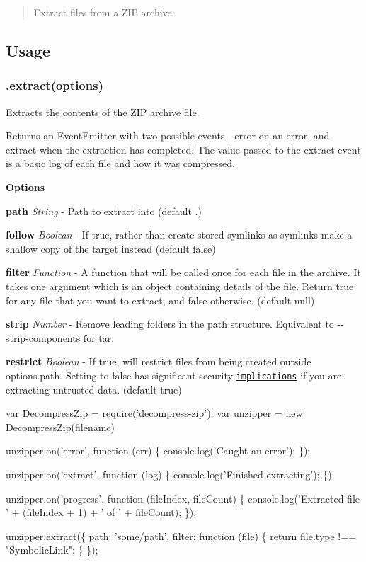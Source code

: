 \begin{quote}
Extract files from a Z\+IP archive \end{quote}


\subsection*{Usage}

\subsubsection*{.extract(options)}

Extracts the contents of the Z\+IP archive {\ttfamily file}.

Returns an Event\+Emitter with two possible events -\/ {\ttfamily error} on an error, and {\ttfamily extract} when the extraction has completed. The value passed to the {\ttfamily extract} event is a basic log of each file and how it was compressed.

{\bfseries Options}
\begin{DoxyItemize}
\item {\bfseries path} {\itshape String} -\/ Path to extract into (default {\ttfamily .})
\item {\bfseries follow} {\itshape Boolean} -\/ If true, rather than create stored symlinks as symlinks make a shallow copy of the target instead (default {\ttfamily false})
\item {\bfseries filter} {\itshape Function} -\/ A function that will be called once for each file in the archive. It takes one argument which is an object containing details of the file. Return true for any file that you want to extract, and false otherwise. (default {\ttfamily null})
\item {\bfseries strip} {\itshape Number} -\/ Remove leading folders in the path structure. Equivalent to {\ttfamily -\/-\/strip-\/components} for tar.
\item {\bfseries restrict} {\itshape Boolean} -\/ If true, will restrict files from being created outside {\ttfamily options.\+path}. Setting to {\ttfamily false} has significant security \href{https://snyk.io/research/zip-slip-vulnerability}{\tt implications} if you are extracting untrusted data. (default {\ttfamily true})
\end{DoxyItemize}


\begin{DoxyCode}
var DecompressZip = require('decompress-zip');
var unzipper = new DecompressZip(filename)

unzipper.on('error', function (err) \{
    console.log('Caught an error');
\});

unzipper.on('extract', function (log) \{
    console.log('Finished extracting');
\});

unzipper.on('progress', function (fileIndex, fileCount) \{
    console.log('Extracted file ' + (fileIndex + 1) + ' of ' + fileCount);
\});

unzipper.extract(\{
    path: 'some/path',
    filter: function (file) \{
        return file.type !== "SymbolicLink";
    \}
\});
\end{DoxyCode}


